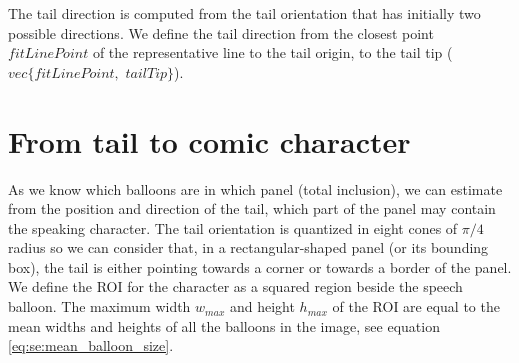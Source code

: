 The tail direction is computed from the tail orientation that has initially two possible directions.
We define the tail direction from the closest point $fitLinePoint$ of the representative line to the tail origin, to the tail tip ($vec\{fitLinePoint,$ $tailTip\}$).




\section{From tail to comic character} %
\label{sec:se:tail_to_character}



As we know which balloons are in which panel (total inclusion), we can estimate from the position and direction of the tail, which part of the panel may contain the speaking character.
The tail orientation is quantized in eight cones of $\pi/4$ radius so we can consider that, in a rectangular-shaped panel (or its bounding box), the tail is either pointing towards a corner or towards a border of the panel.
We define the ROI for the character as a squared region beside the speech balloon.
The maximum width $w_{max}$ and height $h_{max}$ of the ROI are equal to the mean widths and heights of all the balloons in the image, see equation \ref{eq:se:mean_balloon_size}.

